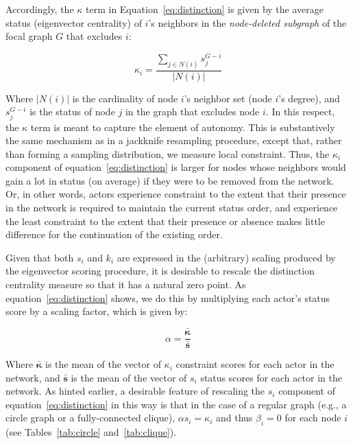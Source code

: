 \documentclass[12pt]{article}
\begin{document}
Accordingly, the $\kappa$ term in Equation~\ref{eq:distinction} is given by the average status (eigenvector centrality) of $i$'s neighbors in the \textit{node-deleted subgraph} of the focal graph $G$ that excludes $i$:

\begin{equation}
    \kappa_i = \frac{\sum_{j \in N(i)}s_j^{G-i}}{|N(i)|}
    \label{eq:kappa}
\end{equation}

Where $|N(i)|$ is the cardinality of node $i$'s neighbor set (node $i$'s degree), and $s_j^{G-i}$ is the status of node $j$ in the graph that excludes node $i$. In this respect, the $\kappa$ term is meant to capture the element of autonomy. This is substantively the same mechanism as in a jackknife resampling procedure, except that, rather than forming a sampling distribution, we measure local constraint. Thus, the $\kappa_i$ component of equation~\ref{eq:distinction} is larger for nodes whose neighbors would gain a lot in status (on average) if they were to be removed from the network. Or, in other words, actors experience constraint to the extent that their presence in the network is required to maintain the current status order, and experience the least constraint to the extent that their presence or absence makes little difference for the continuation of the existing order. 

Given that both $s_i$ and $k_i$ are expressed in the (arbitrary) scaling produced by the eigenvector scoring procedure, it is desirable to rescale the distinction centrality measure so that it has a natural zero point. As equation~\ref{eq:distinction} shows, we do this by multiplying each actor's status score by a scaling factor, which is given by:

\begin{equation}
    \alpha = \frac{\bar{\mathbf{\kappa}}}{\bar{\mathbf{s}}}
    \label{eq:alpha}
\end{equation}

Where $\bar{\mathbf{\kappa}}$ is the mean of the vector of $\kappa_i$ constraint scores for each actor in the network, and $\bar{\mathbf{s}}$ is the mean of the vector of $s_i$ status scores for each actor in the network. As hinted earlier, a desirable feature of rescaling the $s_i$ component of equation~\ref{eq:distinction} in this way is that in the case of a regular graph (e.g., a circle graph or a fully-connected clique), $\alpha s_i = \kappa_i$ and thus $\beta_i = 0$ for each node $i$ (see Tables~\ref{tab:circle} and~\ref{tab:clique}).  
\end{document}
